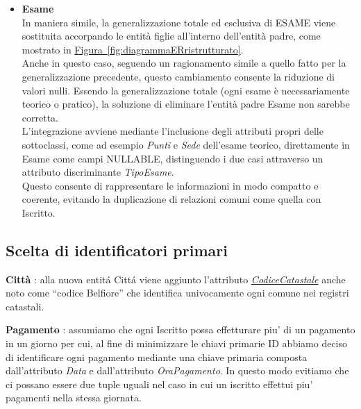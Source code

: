 \documentclass[10pt,twoside]{article}
\begin{document}
{{\begin{itemize}
            spostando in esse gli attributi specifici, ma ciò avrebbe comportato la duplicazione 
            delle relazioni comuni come Prenotazione e Recensione verso entrambe
            le sottoclassi.
            \item \textbf{Esame} \\In maniera simile, la generalizzazione totale ed esclusiva di ESAME viene sostituita 
            accorpando le entità figlie all’interno dell'entità padre, come mostrato in \hyperref[fig:diagrammaERristrutturato]{Figura~\ref*{fig:diagrammaERristrutturato}}. \\ 
            Anche in questo caso, seguendo un ragionamento simile a quello fatto per la 
            generalizzazione precedente, questo cambiamento consente la riduzione di valori nulli.
            Essendo la generalizzazione totale (ogni esame è necessariamente teorico o pratico), 
            la soluzione di eliminare l’entità padre Esame non sarebbe corretta. \\
            L'integrazione avviene mediante l'inclusione degli attributi propri delle sottoclassi,
            come ad esempio \textit{Punti} e \textit{Sede} dell'esame teorico, direttamente in Esame come campi 
            NULLABLE, distinguendo i due casi attraverso un attributo discriminante \textit{TipoEsame}. \\
            Questo consente di rappresentare le informazioni in modo compatto e coerente, 
            evitando la duplicazione di relazioni comuni come quella con Iscritto.
        \end{itemize}
    }

    \subsection{Scelta di identificatori primari}{
        \textbf{Città }: alla nuova entitá Cittá viene aggiunto l’attributo \href{https://www.agenziaentrate.gov.it/portale/documents/20143/448384/Tabella+codici+catastali+comuni_T4_codicicatastali_comuni_24_05_2019.pdf/d4fa70bd-f4bd-caba-24cb-5cc3611237c0}{\textit{CodiceCatastale}} anche noto come “codice
        Belfiore” che identifica univocamente ogni comune nei registri catastali.
        
        \textbf{Pagamento }: assumiamo che ogni Iscritto possa effetturare piu' di un pagamento in un giorno per cui, al fine di minimizzare le chiavi primarie ID abbiamo deciso di identificare ogni pagamento mediante una chiave primaria composta dall'attributo \textit{Data} e dall'attributo \textit{OraPagamento}. In questo modo evitiamo che ci possano essere due tuple uguali nel caso in cui un iscritto effettui piu' pagamenti nella stessa giornata.\\
    }

}
\end{document}
